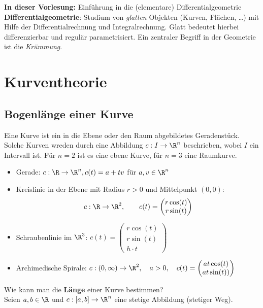 \documentclass{mycourse}
\begin{document}
\textbf{In dieser Vorlesung:} Einführung in die (elementare) Differentialgeometrie \\
\textbf{Differentialgeometrie}: Studium von \emph{glatten} Objekten (Kurven, Flächen, \dots) mit Hilfe der Differentialrechnung und Integralrechnung.
Glatt bedeutet hierbei differenzierbar und regulär parametrisiert.
Ein zentraler Begriff in der Geometrie ist die \emph{Krümmung}.

\newpage


\chapter{Kurventheorie}

\section{Bogenlänge einer Kurve}

Eine Kurve ist ein in die Ebene oder den Raum abgebildetes Geradenstück. Solche Kurven wreden durch eine Abbildung $c: I \to \R^n$ beschrieben, wobei  $I$ ein Intervall ist. Für $n = 2$ ist es eine ebene Kurve, für $n = 3$ eine Raumkurve.

\begin{ex}
\label{1.1}
\begin{itemize}
	\item Gerade: $ c: \R \to \R^n , c(t) = a + t v $ für $ a, v \in \R^n$
	\item Kreislinie in der Ebene mit Radius $ r > 0$ und Mittelpunkt $(0,0)$: \[ c: \R \to \R^2, \qquad c(t) = \begin{pmatrix} r \cos(t) \\  r \sin(t) \end{pmatrix} \]
	\item Schraubenlinie im $\R^3$: $c(t) = \begin{pmatrix} r \cos(t) \\ r \sin(t) \\  h \cdot t \end{pmatrix}$
	\item Archimedische Spirale: $ c: (0,\infty) \to \R^2 , \quad a > 0, \quad c(t) = \begin{pmatrix} a  t  \cos(t) \\ a  t  \sin(t)) \end{pmatrix}$
\end{itemize}
\end{ex}

Wie kann man die \textbf{Länge} einer Kurve bestimmen? \\
Seien $a,b \in \R$ und $c: [a,b] \to \R^n$ eine stetige Abbildung (\glqq stetiger Weg\grqq). \\
\end{document}
